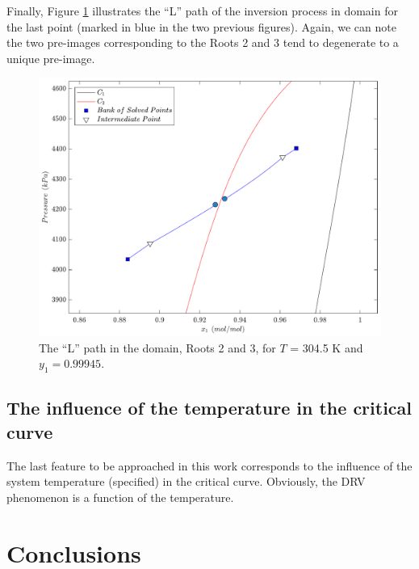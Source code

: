 \documentclass{article}
\theoremstyle{definition}
\theoremstyle{remark}
\begin{document}
Finally, Figure \ref{fig:L_S} illustrates the ``L'' path of the inversion process in domain for the last point (marked in blue in the two previous figures). Again, we can note the two pre-images corresponding to the Roots 2 and 3 tend to degenerate to a unique pre-image.

\begin{figure}
	\begin{center}
		\includegraphics[scale=0.50]{caminhos_L_degeneracao_dominio2.pdf}
		\caption{The ``L'' path in the domain, Roots 2 and 3, for $T$ = 304.5 K and $y_1 = 0.99945$.}\label{fig:L_S}
	\end{center}
\end{figure}



\subsection{The influence of the temperature in the critical curve}

The last feature to be approached in this work corresponds to the influence of the system temperature (specified) in the critical curve. Obviously, the DRV phenomenon is a function of the temperature. 

\section{Conclusions}
\end{document}
